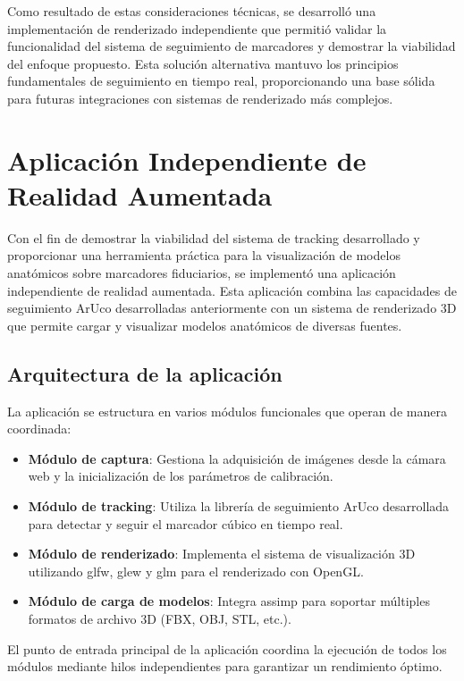 Como resultado de estas consideraciones técnicas, se desarrolló una implementación de renderizado independiente que permitió validar la funcionalidad del sistema de seguimiento de marcadores y demostrar la viabilidad del enfoque propuesto. Esta solución alternativa mantuvo los principios fundamentales de seguimiento en tiempo real, proporcionando una base sólida para futuras integraciones con sistemas de renderizado más complejos.

\section{Aplicación Independiente de Realidad Aumentada}
\label{sec:aplicacion_independiente}

Con el fin de demostrar la viabilidad del sistema de \gls{tracking} desarrollado y proporcionar una herramienta práctica para la visualización de modelos anatómicos sobre marcadores fiduciarios, se implementó una aplicación independiente de realidad aumentada. Esta aplicación combina las capacidades de seguimiento ArUco desarrolladas anteriormente con un sistema de renderizado 3D que permite cargar y visualizar modelos anatómicos de diversas fuentes.

\subsection{Arquitectura de la aplicación}

La aplicación se estructura en varios módulos funcionales que operan de manera coordinada:

\begin{itemize}
    \item \textbf{Módulo de captura}: Gestiona la adquisición de imágenes desde la cámara web y la inicialización de los parámetros de calibración.
    \item \textbf{Módulo de tracking}: Utiliza la librería de seguimiento ArUco desarrollada para detectar y seguir el marcador cúbico en tiempo real.
    \item \textbf{Módulo de renderizado}: Implementa el sistema de visualización 3D utilizando \acrshort{glfw}, \acrshort{glew} y \acrshort{glm} para el renderizado con OpenGL.
    \item \textbf{Módulo de carga de modelos}: Integra \acrshort{assimp} para soportar múltiples formatos de archivo 3D (FBX, OBJ, STL, etc.).
\end{itemize}

El punto de entrada principal de la aplicación coordina la ejecución de todos los módulos mediante hilos independientes para garantizar un rendimiento óptimo.

